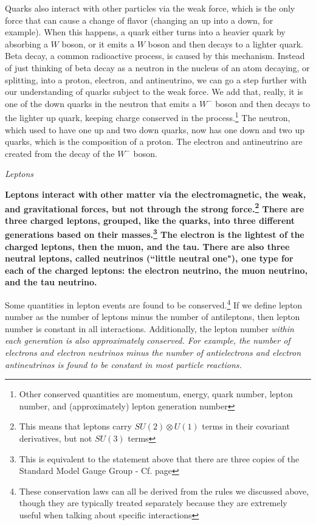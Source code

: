 \documentclass[12pt,epsf]{article}
\begin{document}
Quarks also interact with other particles via the weak force, which is
the only force that can cause a change of flavor (changing an up into a
down, for example).  When this happens, a quark either turns into a
heavier quark by absorbing a $W$ boson, or it emits a $W$ boson and
then decays to a lighter quark.  Beta decay, a common radioactive
process, is caused by this mechanism. Instead of just thinking of beta
decay as a neutron in the nucleus of an atom decaying, or splitting,
into a proton, electron, and antineutrino, we can go a step further
with our understanding of quarks subject to the weak force.  We add
that, really, it is one of the down quarks in the neutron that emits a
$W^-$ boson and then decays to the lighter up quark, keeping charge
conserved in the process.\footnote{Other conserved quantities are
momentum, energy, quark number, lepton number, and (approximately) lepton generation
number}  The neutron, which used to have one up and two down quarks,
now has one down and two up quarks, which is the composition of a
proton.  The electron and antineutrino are created from the decay of
the $W^-$ boson.

\newpage
\begin{center}
\it Leptons \rm
\end{center}

\bf Leptons \rm interact with other matter via the electromagnetic, the
weak, and gravitational forces, but not through the strong
force.\footnote{This means that leptons carry $SU(2)\otimes U(1)$ terms
in their covariant derivatives, but not $SU(3)$ terms} There are three
charged leptons, grouped, like the quarks, into three different
generations based on their masses.\footnote{This is equivalent to the
statement above that there are three copies of the Standard Model Gauge
Group - Cf. page \pageref{smdef}} The electron is the lightest of the
charged leptons, then the muon, and the tau. There are also three
neutral leptons, called neutrinos (``little neutral one"), one type for
each of the charged leptons: the electron neutrino, the muon neutrino,
and the tau neutrino. 

Some quantities in lepton events are found to be
conserved.\footnote{These conservation laws can all be derived from the
rules we discussed above, though they are typically treated separately
because they are extremely useful when talking about specific
interactions} If we define lepton number as the number of leptons
minus the number of antileptons, then lepton number is constant in all
interactions. Additionally, the lepton number \it within each generation \rm
is also approximately conserved. For example, the number of electrons and electron neutrinos
minus the number of antielectrons and electron antineutrinos is found
to be constant in most particle reactions.
\end{document}
